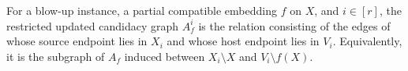 \begin{definition}
For a blow-up instance, a partial compatible embedding $f$ on $X$, and $i\in[r]$, the restricted updated candidacy graph $A_f^i$ is the relation consisting of the edges of  whose source endpoint lies in $X_i$ and whose host endpoint lies in $V_i$.  Equivalently, it is the subgraph of $A_f$ induced between $X_i\setminus X$ and $V_i\setminus f(X)$.
\end{definition}
